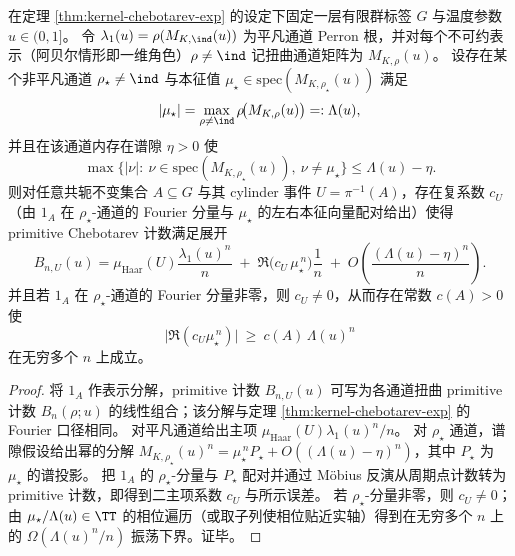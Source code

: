 \begin{theorem}\label{thm:kernel-chebotarev-second-main-term-witness}
在定理 \ref{thm:kernel-chebotarev-exp} 的设定下固定一层有限群标签 \(G\) 与温度参数 \(u\in(0,1]\)。
令 \(\lambda_1(u)=\rho(M_{K,\ind}(u))\) 为平凡通道 Perron 根，并对每个不可约表示（阿贝尔情形即一维角色）\(\rho\neq \ind\) 记扭曲通道矩阵为 \(M_{K,\rho}(u)\)。
设存在某个非平凡通道 \(\rho_\star\neq\ind\) 与本征值 \(\mu_\star\in\mathrm{spec}(M_{K,\rho_\star}(u))\) 满足
\[
|\mu_\star|
=
\max_{\rho\neq\ind}\rho\!\bigl(M_{K,\rho}(u)\bigr)
=:\Lambda(u),
\]
并且在该通道内存在谱隙 \(\eta>0\) 使
\[
\max\bigl\{|\nu|:\ \nu\in\mathrm{spec}(M_{K,\rho_\star}(u)),\ \nu\neq \mu_\star\bigr\}\le \Lambda(u)-\eta.
\]
则对任意共轭不变集合 \(A\subseteq G\) 与其 cylinder 事件 \(U=\pi^{-1}(A)\)，存在复系数 \(c_U\)（由 \(1_A\) 在 \(\rho_\star\)-通道的 Fourier 分量与 \(\mu_\star\) 的左右本征向量配对给出）使得 primitive Chebotarev 计数满足展开
\[
B_{n,U}(u)
=
\mu_{\mathrm{Haar}}(U)\frac{\lambda_1(u)^n}{n}
\;+\;
\Re\!\bigl(c_U\,\mu_\star^{\,n}\bigr)\frac{1}{n}
\;+\;
O\!\left(\frac{(\Lambda(u)-\eta)^n}{n}\right).
\]
并且若 \(1_A\) 在 \(\rho_\star\)-通道的 Fourier 分量非零，则 \(c_U\neq 0\)，从而存在常数 \(c(A)>0\) 使
\[
\bigl|\Re(c_U\mu_\star^{\,n})\bigr|\ \ge\ c(A)\,\Lambda(u)^n
\]
在无穷多个 \(n\) 上成立。
\end{theorem}

\begin{proof}
将 \(1_A\) 作表示分解，primitive 计数 \(B_{n,U}(u)\) 可写为各通道扭曲 primitive 计数 \(B_n(\rho;u)\) 的线性组合；该分解与定理 \ref{thm:kernel-chebotarev-exp} 的 Fourier 口径相同。
对平凡通道给出主项 \(\mu_{\mathrm{Haar}}(U)\lambda_1(u)^n/n\)。
对 \(\rho_\star\) 通道，谱隙假设给出幂的分解
\(
M_{K,\rho_\star}(u)^n=\mu_\star^{\,n}P_\star+O((\Lambda(u)-\eta)^n)
\)，其中 \(P_\star\) 为 \(\mu_\star\) 的谱投影。
把 \(1_A\) 的 \(\rho_\star\)-分量与 \(P_\star\) 配对并通过 Möbius 反演从周期点计数转为 primitive 计数，即得到二主项系数 \(c_U\) 与所示误差。
若 \(\rho_\star\)-分量非零，则 \(c_U\neq 0\)；由 \(\mu_\star/\Lambda(u)\in\TT\) 的相位遍历（或取子列使相位贴近实轴）得到在无穷多个 \(n\) 上的 \(\Omega(\Lambda(u)^n/n)\) 振荡下界。证毕。
\end{proof}

\endinput
